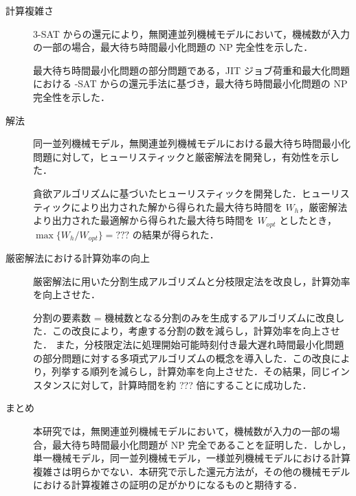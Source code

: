 \documentclass[12pt]{optlab-bachelor}
\begin{document}
\begin{description}
  \item[計算複雑さ ] \textsc{3-SAT} からの還元により，無関連並列機械モデルにおいて，機械数が入力の一部の場合，最大待ち時間最小化問題の NP 完全性を示した．

  最大待ち時間最小化問題の部分問題である，JIT ジョブ荷重和最大化問題における {-SAT} からの還元手法に基づき，最大待ち時間最小化問題の NP  完全性を示した．

  \item[解法 ] 同一並列機械モデル，無関連並列機械モデルにおける最大待ち時間最小化問題に対して，ヒューリスティックと厳密解法を開発し，有効性を示した．

  貪欲アルゴリズムに基づいたヒューリスティックを開発した．ヒューリスティックにより出力された解から得られた最大待ち時間を $W_h$，厳密解法より出力された最適解から得られた最大待ち時間を $W_{opt}$ としたとき，$\max\big\{W_h/W_{opt}\big\} = ???$ の結果が得られた．

  \item[厳密解法における計算効率の向上 ] 厳密解法に用いた分割生成アルゴリズムと分枝限定法を改良し，計算効率を向上させた．

  分割の要素数 = 機械数となる分割のみを生成するアルゴリズムに改良した．この改良により，考慮する分割の数を減らし，計算効率を向上させた．
  また，分枝限定法に処理開始可能時刻付き最大遅れ時間最小化問題の部分問題に対する多項式アルゴリズムの概念を導入した．この改良により，列挙する順列を減らし，計算効率を向上させた．その結果，同じインスタンスに対して，計算時間を約 ??? 倍にすることに成功した．

  \item[まとめ ] 本研究では，無関連並列機械モデルにおいて，機械数が入力の一部の場合，最大待ち時間最小化問題が NP 完全であることを証明した．しかし，単一機械モデル，同一並列機械モデル，一様並列機械モデルにおける計算複雑さは明らかでない．本研究で示した還元方法が，その他の機械モデルにおける計算複雑さの証明の足がかりになるものと期待する．
\end{description}
\end{document}
